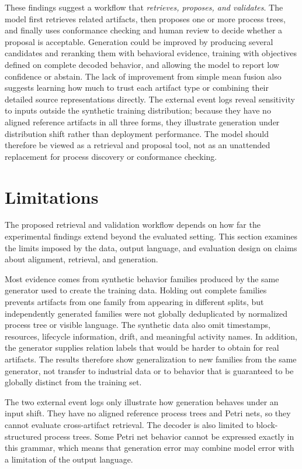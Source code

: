 \documentclass[mathematics,article,submit,moreauthors]{Definitions/mdpi}
\begin{document}
These findings suggest a workflow that \emph{retrieves, proposes, and validates}. The model first retrieves related artifacts, then proposes one or more process trees, and finally uses conformance checking and human review to decide whether a proposal is acceptable. Generation could be improved by producing several candidates and reranking them with behavioral evidence, training with objectives defined on complete decoded behavior, and allowing the model to report low confidence or abstain. The lack of improvement from simple mean fusion also suggests learning how much to trust each artifact type or combining their detailed source representations directly. The external event logs reveal sensitivity to inputs outside the synthetic training distribution; because they have no aligned reference artifacts in all three forms, they illustrate generation under distribution shift rather than deployment performance. The model should therefore be viewed as a retrieval and proposal tool, not as an unattended replacement for process discovery or conformance checking.

\FloatBarrier
\section{Limitations}\label{sec:threats}

The proposed retrieval and validation workflow depends on how far the experimental findings extend beyond the evaluated setting. This section examines the limits imposed by the data, output language, and evaluation design on claims about alignment, retrieval, and generation.

Most evidence comes from synthetic behavior families produced by the same generator used to create the training data. Holding out complete families prevents artifacts from one family from appearing in different splits, but independently generated families were not globally deduplicated by normalized process tree or visible language. The synthetic data also omit timestamps, resources, lifecycle information, drift, and meaningful activity names. In addition, the generator supplies relation labels that would be harder to obtain for real artifacts. The results therefore show generalization to new families from the same generator, not transfer to industrial data or to behavior that is guaranteed to be globally distinct from the training set.

The two external event logs only illustrate how generation behaves under an input shift. They have no aligned reference process trees and Petri nets, so they cannot evaluate cross-artifact retrieval. The decoder is also limited to block-structured process trees. Some Petri net behavior cannot be expressed exactly in this grammar, which means that generation error may combine model error with a limitation of the output language.
\end{document}
